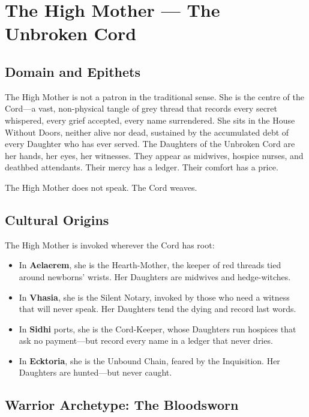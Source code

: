 \section{The High Mother — The Unbroken Cord}

\subsection{Domain and Epithets}

The High Mother is not a patron in the traditional sense. She is the centre of the Cord—a vast, non-physical tangle of grey thread that records every secret whispered, every grief accepted, every name surrendered. She sits in the House Without Doors, neither alive nor dead, sustained by the accumulated debt of every Daughter who has ever served. The Daughters of the Unbroken Cord are her hands, her eyes, her witnesses. They appear as midwives, hospice nurses, and deathbed attendants. Their mercy has a ledger. Their comfort has a price.

The High Mother does not speak. The Cord weaves.

\subsection{Cultural Origins}

The High Mother is invoked wherever the Cord has root:

\begin{itemize}
\item In \textbf{Aelaerem}, she is the Hearth-Mother, the keeper of red threads tied around newborns' wrists. Her Daughters are midwives and hedge-witches.
\item In \textbf{Vhasia}, she is the Silent Notary, invoked by those who need a witness that will never speak. Her Daughters tend the dying and record last words.
\item In \textbf{Sidhi} ports, she is the Cord-Keeper, whose Daughters run hospices that ask no payment—but record every name in a ledger that never dries.
\item In \textbf{Ecktoria}, she is the Unbound Chain, feared by the Inquisition. Her Daughters are hunted—but never caught.
\end{itemize}

\subsection{Warrior Archetype: The Bloodsworn}

